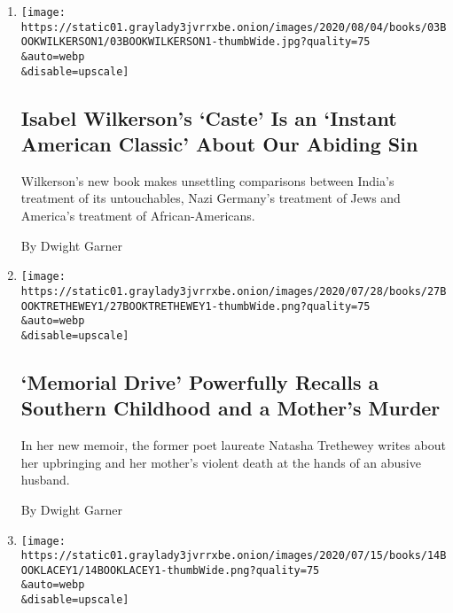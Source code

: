 \begin{enumerate}
\def\labelenumi{\arabic{enumi}.}
\item
  \href{/2020/07/31/books/review-caste-isabel-wilkerson-origins-of-our-discontents.html}{}

  \texttt{[image: https://static01.graylady3jvrrxbe.onion/images/2020/08/04/books/03BOOKWILKERSON1/03BOOKWILKERSON1-thumbWide.jpg?quality=75\\\&auto=webp\\\&disable=upscale]}

  \hypertarget{isabel-wilkersons-caste-is-an-instant-american-classic-about-our-abiding-sin}{%
  \subsection{Isabel Wilkerson's `Caste' Is an `Instant American
  Classic' About Our Abiding
  Sin}\label{isabel-wilkersons-caste-is-an-instant-american-classic-about-our-abiding-sin}}

  Wilkerson's new book makes unsettling comparisons between India's
  treatment of its untouchables, Nazi Germany's treatment of Jews and
  America's treatment of African-Americans.

  By Dwight Garner
\item
  \href{/2020/07/27/books/review-memorial-drive-memoir-natasha-trethewey.html}{}

  \texttt{[image: https://static01.graylady3jvrrxbe.onion/images/2020/07/28/books/27BOOKTRETHEWEY1/27BOOKTRETHEWEY1-thumbWide.png?quality=75\\\&auto=webp\\\&disable=upscale]}

  \hypertarget{memorial-drive-powerfully-recalls-a-southern-childhood-and-a-mothers-murder}{%
  \subsection{`Memorial Drive' Powerfully Recalls a Southern Childhood
  and a Mother's
  Murder}\label{memorial-drive-powerfully-recalls-a-southern-childhood-and-a-mothers-murder}}

  In her new memoir, the former poet laureate Natasha Trethewey writes
  about her upbringing and her mother's violent death at the hands of an
  abusive husband.

  By Dwight Garner
\item
  \href{/2020/07/13/books/review-pew-catherine-lacey.html}{}

  \texttt{[image: https://static01.graylady3jvrrxbe.onion/images/2020/07/15/books/14BOOKLACEY1/14BOOKLACEY1-thumbWide.png?quality=75\\\&auto=webp\\\&disable=upscale]}


\end{enumerate}
